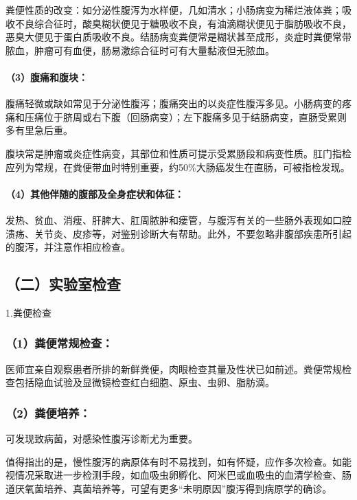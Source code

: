 粪便性质的改变：如分泌性腹泻为水样便，几如清水；小肠病变为稀烂液体粪；吸收不良综合征时，酸臭糊状便见于糖吸收不良，有油滴糊状便见于脂肪吸收不良，恶臭大便见于蛋白质吸收不良。结肠病变粪便常是糊状甚至成形，炎症时粪便常带脓血，肿瘤可有血便，肠易激综合征时可有大量黏液但无脓血。

\paragraph{（3）腹痛和腹块：}

腹痛轻微或缺如常见于分泌性腹泻；腹痛突出的以炎症性腹泻多见。小肠病变的疼痛和压痛位于脐周或右下腹（回肠病变）；左下腹痛多见于结肠病变，直肠受累则多有里急后重。

腹块常是肿瘤或炎症性病变，其部位和性质可提示受累肠段和病变性质。肛门指检应列为常规，在粪便带血时特别重要，约50\%大肠癌发生在直肠，可被指检发现。

\paragraph{（4）其他伴随的腹部及全身症状和体征：}

发热、贫血、消瘦、肝脾大、肛周脓肿和瘘管，与腹泻有关的一些肠外表现如口腔溃疡、关节炎、皮疹等，对鉴别诊断大有帮助。此外，不要忽略非腹部疾患所引起的腹泻，并注意作相应检查。

\subsection{（二）实验室检查}

1.粪便检查

\subsubsection{（1）粪便常规检查：}

医师宜亲自观察患者所排的新鲜粪便，肉眼检查其量及性状已如前述。粪便常规检查包括隐血试验及显微镜检查红白细胞、原虫、虫卵、脂肪滴。

\subsubsection{（2）粪便培养：}

可发现致病菌，对感染性腹泻诊断尤为重要。

值得指出的是，慢性腹泻的病原体有时不易找到，如有怀疑，应作多次检查。如能视情况采取进一步检测手段，如血吸虫卵孵化、阿米巴或血吸虫的血清学检查、肠道厌氧菌培养、真菌培养等，可望有更多“未明原因”腹泻得到病原学的确诊。

